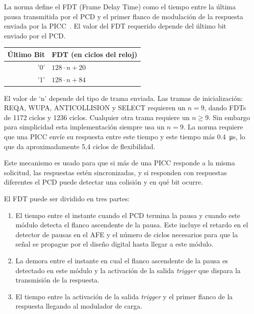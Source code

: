 \documentclass[a4paper, twoside, 11pt]{report}
\begin{document}
La norma define el FDT (Frame Delay Time) como el tiempo entre la última pausa transmitida por el PCD y el primer flanco de modulación de la respuesta enviada por la PICC~\cite{iso14443-3}. El valor del FDT requerido depende del último bit enviado por el PCD.

\begin{tabular}{r | l}
    \textbf{Último} Bit & \textbf{FDT (en ciclos del reloj)} \\
    \hline
    '0' & $128 \cdot n + 20$ \\
    '1' & $128 \cdot n + 84$ \\
\end{tabular}

El valor de ‘n’ depende del tipo de trama enviada. Las tramas de inicialización: REQA, WUPA, ANTICOLLISION y SELECT requieren un $n = 9$, dando FDTs de 1172 ciclos y 1236 ciclos. Cualquier otra trama requiere un $n \ge 9$. Sin embargo para simplicidad esta implementación siempre usa un $n = 9$. La norma requiere que una PICC envíe su respuesta entre este tiempo y este tiempo más \SI{0.4}{\micro\second}, lo que da aproximadamente 5,4 ciclos de flexibilidad.

Este mecanismo es usado para que si más de una PICC responde a la misma solicitud, las respuestas estén sincronizadas, y si responden con respuestas diferentes el PCD puede detectar una colisión y en qué bit ocurre.

El FDT puede ser dividido en tres partes:

\begin{enumerate}
  \item El tiempo entre el instante cuando el PCD termina la pausa y cuando este módulo detecta el flanco ascendente de la pausa. Este incluye el retardo en el detector de pausas en el AFE y el número de ciclos necesarios para que la señal se propague por el diseño digital hasta llegar a este módulo.
  \item La demora entre el instante en cual el flanco ascendente de la pausa es detectado en este módulo y la activación de la salida \textit{trigger} que dispara la transmisión de la respuesta.
  \item El tiempo entre la activación de la salida \textit{trigger} y el primer flanco de la respuesta llegando al modulador de carga.
\end{enumerate}
\end{document}
